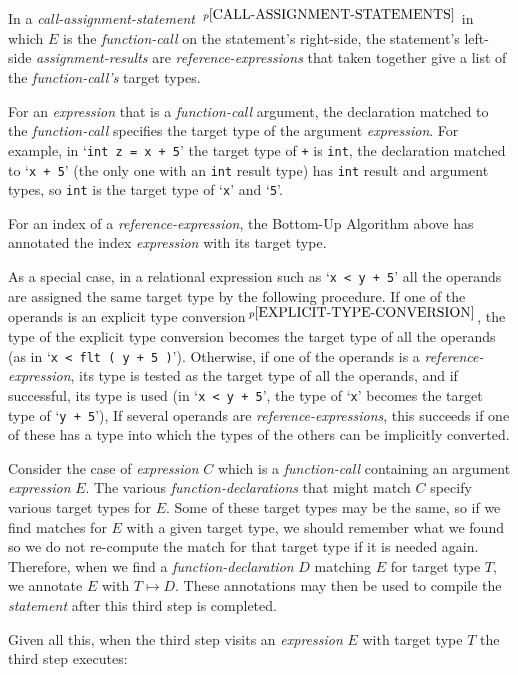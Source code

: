 \documentclass[12pt]{article}
\newcommand{\pagnote}[1]{$\,^{p\pageref{#1}}$}
\begin{document}
In a {\em call-assignment-statement}%
\pagnote{CALL-ASSIGNMENT-STATEMENTS} in which $E$ is the {\em function-call}
on the statement's right-side, the statement's
left-side {\em assignment-results} are {\em reference-expressions} that
taken together give a list of the {\em function-call's} target types.

For an {\em expression} that is a {\em function-call} argument,
the declaration matched to the {\em function-call} specifies the
target type of the argument {\em expression}.  For example, in
`{\tt int z = x + 5}' the target type of {\tt +} is {\tt int},
the declaration matched to `{\tt x +  5}' (the only one with an {\tt int}
result type) has {\tt int} result
and argument types, so {\tt int} is the target type of `{\tt x}' and `{\tt 5}'.

For an index of a {\em reference-expression}, the Bottom-Up
Algorithm above has annotated the index {\em expression} with its target type.

As a special case, in a relational expression such as `{\tt x < y + 5}'
all the operands are assigned the same target type by the following
procedure.
If one of the operands is
an explicit type conversion\pagnote{EXPLICIT-TYPE-CONVERSION},
the type of the explicit type conversion
becomes the target type of all the operands
(as in `{\tt x < flt ( y + 5 )}').
Otherwise, if
one of the operands is a {\em reference-expression},
its type is tested as the target type of all the operands,
and if successful, its type is used
(in `{\tt x < y + 5}',
the type of `{\tt x}' becomes the target type of `{\tt y + 5}'),
If several operands are {\em reference-expressions}, this succeeds if
one of these has a type into which the types of the others can be
implicitly converted.

Consider the case of {\em expression} $C$ which is a {\em function-call}
containing an argument {\em expression} $E$.  The various
{\em function-declarations} that might match $C$ specify various
target types for $E$.  Some of these target types may be the same,
so if we find matches for $E$ with a given target type, we should
remember what we found so we do not re-compute the match for
that target type if it is needed again.  Therefore, when we find a
{\em function-declaration} $D$ matching $E$ for target type $T$, we annotate
$E$ with $T\mapsto D$.  These annotations may then be used to compile
the {\em statement} after this third step is completed.

Given all this, when the third step visits an {\em expression} $E$ with
target type $T$ the third step executes:
\end{document}
